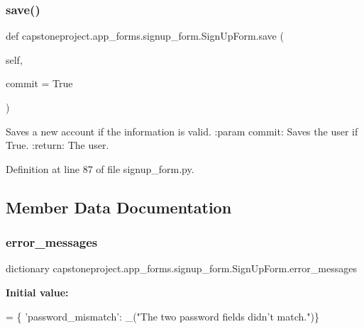 \subsubsection{\texorpdfstring{save()}{save()}}
{\footnotesize\ttfamily def capstoneproject.\+app\+\_\+forms.\+signup\+\_\+form.\+Sign\+Up\+Form.\+save (\begin{DoxyParamCaption}\item[{}]{self,  }\item[{}]{commit = {\ttfamily True} }\end{DoxyParamCaption})}

\begin{DoxyVerb}Saves a new account if the information is valid.
:param commit: Saves the user if True.
:return: The user.
\end{DoxyVerb}
 

Definition at line 87 of file signup\+\_\+form.\+py.



\subsection{Member Data Documentation}
\mbox{\label{classcapstoneproject_1_1app__forms_1_1signup__form_1_1_sign_up_form_ac68ce8b69e6cf0465f7a5860b07d2b67}} 
\subsubsection{\texorpdfstring{error\+\_\+messages}{error\_messages}}
{\footnotesize\ttfamily dictionary capstoneproject.\+app\+\_\+forms.\+signup\+\_\+form.\+Sign\+Up\+Form.\+error\+\_\+messages\hspace{0.3cm}{\ttfamily [static]}}

{\bfseries Initial value\+:}
\begin{DoxyCode}
=  \{
        \textcolor{stringliteral}{'password\_mismatch'}: \_(\textcolor{stringliteral}{"The two password fields didn't match."})\}
\end{DoxyCode}


